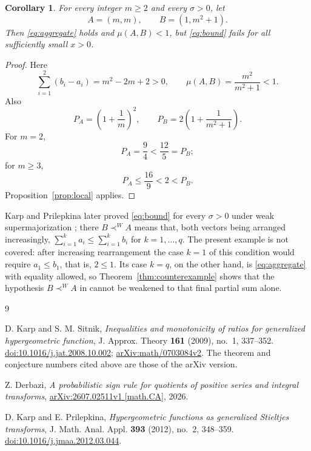 \documentclass[11pt]{amsart}
\newtheorem{corollary}[theorem]{Corollary}
\begin{document}
\begin{corollary}\label{cor:family}
For every integer $m\ge2$ and every $\sigma>0$, let
\[
 A=(m,m),
 \qquad
 B=(1,m^2+1).
\]
Then \eqref{eq:aggregate} holds and $\mu(A,B)<1$, but \eqref{eq:bound} fails
for all sufficiently small $x>0$.
\end{corollary}

\begin{proof}
Here
\[
 \sum_{i=1}^2(b_i-a_i)=m^2-2m+2>0,
 \qquad
 \mu(A,B)=\frac{m^2}{m^2+1}<1.
\]
Also
\[
 P_A=\left(1+\frac1m\right)^2,
 \qquad
 P_B=2\left(1+\frac1{m^2+1}\right).
\]
For $m=2$,
\[
 P_A=\frac94<\frac{12}{5}=P_B;
\]
for $m\ge3$,
\[
 P_A\le\frac{16}{9}<2<P_B.
\]
Proposition~\ref{prop:local} applies.
\end{proof}

Karp and Prilepkina later proved \eqref{eq:bound} for every $\sigma>0$
under weak supermajorization \cite[Theorem~5]{KP}; there $B\prec^W A$ means
that, both vectors being arranged increasingly,
$\sum_{i=1}^{k}a_i\le\sum_{i=1}^{k}b_i$ for $k=1,\ldots,q$. The present
example is not covered: after increasing rearrangement the case $k=1$ of
this condition would require $a_1\le b_1$, that is, $2\le1$. Its case
$k=q$, on the other hand, is \eqref{eq:aggregate} with equality allowed, so
Theorem~\ref{thm:counterexample} shows that the hypothesis $B\prec^W A$ in
\cite[Theorem~5]{KP} cannot be weakened to that final partial sum alone.

\begin{thebibliography}{9}
\small

D. Karp and S. M. Sitnik,
\emph{Inequalities and monotonicity of ratios for generalized hypergeometric
function},
J. Approx. Theory \textbf{161} (2009), no.~1, 337--352.
\href{https://doi.org/10.1016/j.jat.2008.10.002}
{doi:10.1016/j.jat.2008.10.002};
\href{https://arxiv.org/abs/math/0703084}
{arXiv:math/0703084v2}.
The theorem and conjecture numbers cited above are those of the arXiv
version.

Z. Derbazi,
\emph{A probabilistic sign rule for quotients of positive series and integral
transforms},
\href{https://arxiv.org/abs/2607.02511}
{arXiv:2607.02511v1 [math.CA]}, 2026.

D. Karp and E. Prilepkina,
\emph{Hypergeometric functions as generalized Stieltjes transforms},
J. Math. Anal. Appl. \textbf{393} (2012), no.~2, 348--359.
\href{https://doi.org/10.1016/j.jmaa.2012.03.044}
{doi:10.1016/j.jmaa.2012.03.044}.

\end{thebibliography}
\end{document}
